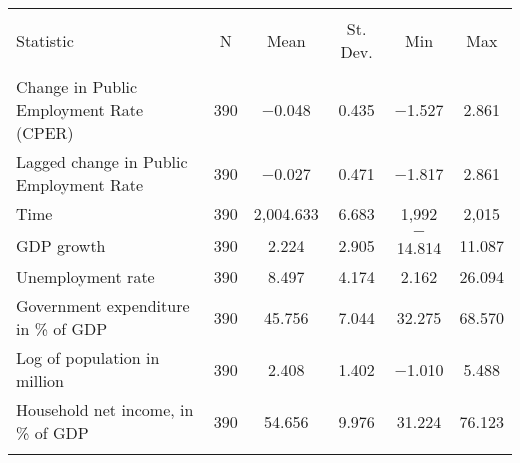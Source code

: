 
\begin{table}[!htbp] \centering 
  \caption{} 
  \label{} 
\footnotesize 
\begin{tabular}{@{\extracolsep{5pt}}lccccc} 
\\[-1.8ex]\hline 
\hline \\[-1.8ex] 
Statistic & \multicolumn{1}{c}{N} & \multicolumn{1}{c}{Mean} & \multicolumn{1}{c}{St. Dev.} & \multicolumn{1}{c}{Min} & \multicolumn{1}{c}{Max} \\ 
\hline \\[-1.8ex] 
Change in Public Employment Rate (CPER) & 390 & $-$0.048 & 0.435 & $-$1.527 & 2.861 \\ 
Lagged change in Public Employment Rate & 390 & $-$0.027 & 0.471 & $-$1.817 & 2.861 \\ 
Time & 390 & 2,004.633 & 6.683 & 1,992 & 2,015 \\ 
GDP growth & 390 & 2.224 & 2.905 & $-$14.814 & 11.087 \\ 
Unemployment rate & 390 & 8.497 & 4.174 & 2.162 & 26.094 \\ 
Government expenditure in \% of GDP & 390 & 45.756 & 7.044 & 32.275 & 68.570 \\ 
Log of population in million & 390 & 2.408 & 1.402 & $-$1.010 & 5.488 \\ 
Household net income, in \% of GDP & 390 & 54.656 & 9.976 & 31.224 & 76.123 \\ 
\hline \\[-1.8ex] 
\end{tabular} 
\end{table} 
